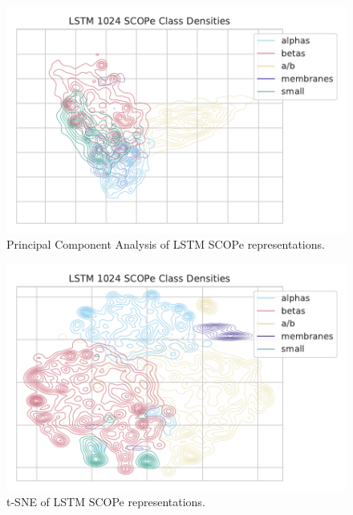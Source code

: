 \documentclass[a4paper,12pt]{article}
\begin{document}
\begin{minipage}{\linewidth}
	\centering
	\begin{minipage}{0.48\linewidth}
		\begin{figure}[H]
			\includegraphics[width=\linewidth]{figures/fig2c_LSTM_1024_no_trunc_PCA.pdf}
			\caption{Principal Component Analysis of LSTM SCOPe representations.}
			\label{fig:LSTM_pca_compare}
		\end{figure}
	\end{minipage}
	\hfill
	\begin{minipage}{0.48\linewidth}
		\begin{figure}[H]
			\includegraphics[width=\linewidth]{figures/fig2c_LSTM_1024_no_trunc.pdf}
			\caption{t-SNE of LSTM SCOPe representations.}
			\label{fig:LSTM_tSNE_compare}
		\end{figure}
	\end{minipage}
\end{minipage}
\end{document}
